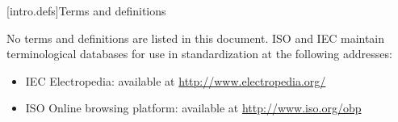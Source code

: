
[intro.defs]{Terms and definitions}

\pnum
{}%
No terms and definitions are listed in this document. ISO and IEC maintain
terminological databases for use in standardization at the following addresses:

\begin{itemize}
    \item IEC Electropedia: available at \url{http://www.electropedia.org/}
    \item ISO Online browsing platform: available at \url{http://www.iso.org/obp}
\end{itemize}
